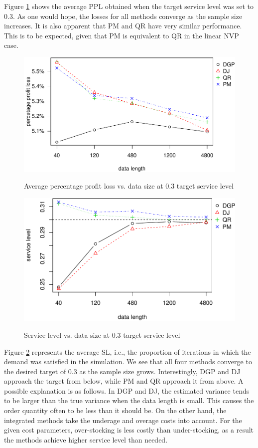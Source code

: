 \documentclass{article}
\begin{document}
 Figure \ref{fig:ppl0.3} shows the average PPL obtained when the target service level was set to $0.3$. As one would hope, the losses for all methods converge as the sample size increases. It is also apparent that PM and QR have very similar performance. This is to be expected, given that PM is equivalent to QR in the linear NVP case.

\begin{figure}
\centering
\caption{Average percentage profit loss vs. data size at 0.3 target service level}
\includegraphics{linear-norm-plot_files/figure-latex/ppl0.3-1.pdf}
\label{fig:ppl0.3}
\end{figure}

\begin{figure}[ht]
\centering
\caption{Service level vs. data size at 0.3 target service level}
\includegraphics{linear-norm-plot_files/figure-latex/sl-3.pdf}
\label{fig:sl0.3}
\end{figure}

Figure \ref{fig:sl0.3} represents the average SL, i.e., the proportion of iterations in which the demand was satisfied in the simulation.
We see that all four methods converge to the desired target of 0.3 as the sample size grows. Interestingly, DGP and DJ approach the target from below, while PM and QR approach it from above. A possible explanation is as follows. In DGP and DJ, the estimated variance tends to be larger than the true variance when the data length is small. This causes the order quantity often to be less than it should be. On the other hand, the integrated methods take the underage and overage costs into account. For the given cost parameters, over-stocking is less costly than under-stocking, as a result the methods achieve higher service level than needed.
\end{document}
